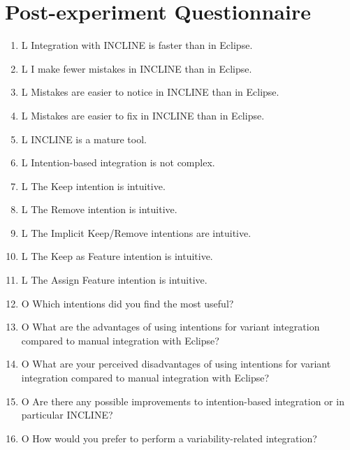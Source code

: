 \section{Post-experiment Questionnaire}
\begin{enumerate}
    \item \colorbox{likert}{L} Integration with INCLINE is faster than in Eclipse.
    \item \colorbox{likert}{L} I make fewer mistakes in INCLINE than in Eclipse.
    \item \colorbox{likert}{L} Mistakes are easier to notice in INCLINE than in Eclipse.
    \item \colorbox{likert}{L} Mistakes are easier to fix in INCLINE than in Eclipse.
    \item \colorbox{likert}{L} INCLINE is a mature tool.
    \item \colorbox{likert}{L} Intention-based integration is not complex.
    \item \colorbox{likert}{L} The Keep intention is intuitive.
    \item \colorbox{likert}{L} The Remove intention is intuitive.
    \item \colorbox{likert}{L} The Implicit Keep/Remove intentions are intuitive.
    \item \colorbox{likert}{L} The Keep as Feature intention is intuitive.
    \item \colorbox{likert}{L} The Assign Feature intention is intuitive.
    \item \colorbox{openq}{O} Which intentions did you find the most useful?
    \item \colorbox{openq}{O} What are the advantages of using intentions for variant integration compared to manual integration with Eclipse?
    \item \colorbox{openq}{O} What are your perceived disadvantages of using intentions for variant integration compared to manual integration with Eclipse?
    \item \colorbox{openq}{O} Are there any possible improvements to intention-based integration or in particular INCLINE?
    \item \colorbox{openq}{O} How would you prefer to perform a variability-related integration?
\end{enumerate}